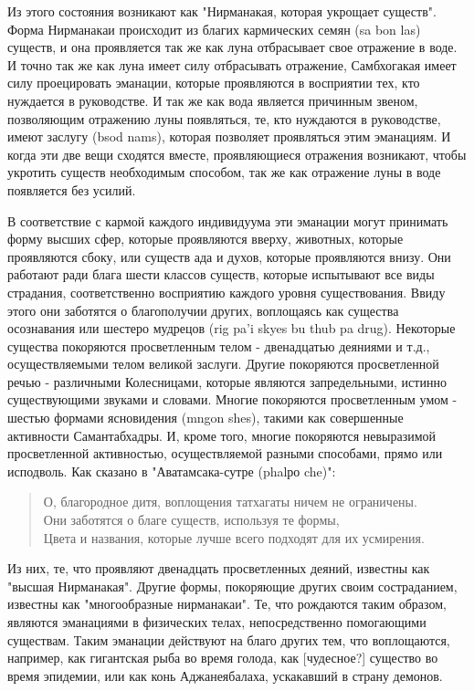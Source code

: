 Из этого состояния возникают как "Нирманакая, которая укрощает существ". Форма
Нирманакаи происходит из благих кармических семян (sa bon las) существ, и она
проявляется так же как луна отбрасывает свое отражение в воде. И точно так же как луна
имеет силу отбрасывать отражение, Самбхогакая имеет силу проецировать эманации,
которые проявляются в восприятии тех, кто нуждается в руководстве. И так же как вода
является причинным звеном, позволяющим отражению луны появляться, те, кто нуждаются
в руководстве, имеют заслугу (bsod nams), которая позволяет проявляться этим эманациям. И
когда эти две вещи сходятся вместе, проявляющиеся отражения возникают, чтобы укротить
существ необходимым способом, так же как отражение луны в воде появляется без усилий.

В соответствие с кармой каждого индивидуума эти эманации могут принимать форму
высших сфер, которые проявляются вверху, животных, которые проявляются сбоку, или
существ ада и духов, которые проявляются внизу. Они работают ради блага шести классов
существ, которые испытывают все виды страдания, соответственно восприятию каждого
уровня существования. Ввиду этого они заботятся о благополучии других, воплощаясь как
существа осознавания или шестеро мудрецов (rig pa'i skyes bu thub pa drug). Некоторые
существа покоряются просветленным телом - двенадцатью деяниями и т.д.,
осуществляемыми телом великой заслуги. Другие покоряются просветленной речью -
различными Колесницами, которые являются запредельными, истинно существующими
звуками и словами. Многие покоряются просветленным умом - шестью формами
ясновидения (mngon shes), такими как совершенные активности Самантабхадры. И, кроме
того, многие покоряются невыразимой просветленной активностью, осуществляемой
разными способами, прямо или исподволь. Как сказано в "Аватамсака-сутре (phalро che)":

\begin{verse}
О, благородное дитя, воплощения татхагаты ничем не ограничены.\\
Они заботятся о благе существ, используя те формы,\\
Цвета и названия, которые лучше всего подходят для их усмирения.
\end{verse}

Из них, те, что проявляют двенадцать просветленных деяний, известны как "высшая
Нирманакая". Другие формы, покоряющие других своим состраданием, известны как
"многообразные нирманакаи". Те, что рождаются таким образом, являются эманациями в
физических телах, непосредственно помогающими существам. Таким эманации действуют
на благо других тем, что воплощаются, например, как гигантская рыба во время голода, как
[чудесное?] существо во время эпидемии, или как конь Аджанеябалаха, ускакавший в страну
демонов.

